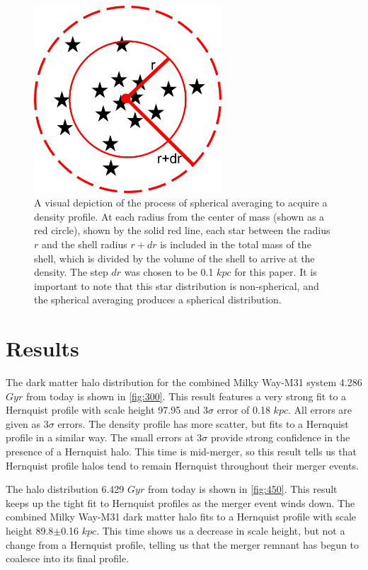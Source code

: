 \documentclass[linenumbers]{aastex631}
\begin{document}
\begin{figure}
    \centering
    \includegraphics[width=7cm, height=7cm]{Spherical Averaging figure.png}
    \caption{A visual depiction of the process of spherical averaging to acquire a density profile. At each radius from the center of mass (shown as a red circle), shown by the solid red line, each star between the radius $r$ and the shell radius $r+dr$ is included in the total mass of the shell, which is divided by the volume of the shell to arrive at the density. The step $dr$ was chosen to be 0.1 $kpc$ for this paper. It is important to note that this star distribution is non-spherical, and the spherical averaging produces a spherical distribution.}
    \label{fig:sph}
\end{figure}

\section{Results}
The dark matter halo distribution for the combined Milky Way-M31 system 4.286 $Gyr$ from today is shown in \ref{fig:300}. This result features a very strong fit to a Hernquist profile with scale height 97.95 and 3$\sigma$ error of 0.18 $kpc$. All errors are given as 3$\sigma$ errors. The density profile has more scatter, but fits to a Hernquist profile in a similar way. The small errors at 3$\sigma$ provide strong confidence in the presence of a Hernquist halo. This time is mid-merger, so this result tells us that Hernquist profile halos tend to remain Hernquist throughout their merger events.

The halo distribution 6.429 $Gyr$ from today is shown in \ref{fig:450}. This result keeps up the tight fit to Hernquist profiles as the merger event winds down. The combined Milky Way-M31 dark matter halo fits to a Hernquist profile with scale height 89.8$\pm$0.16 $kpc$. This time shows us a decrease in scale height, but not a change from a Hernquist profile, telling us that the merger remnant has begun to coalesce into its final profile.
\end{document}
